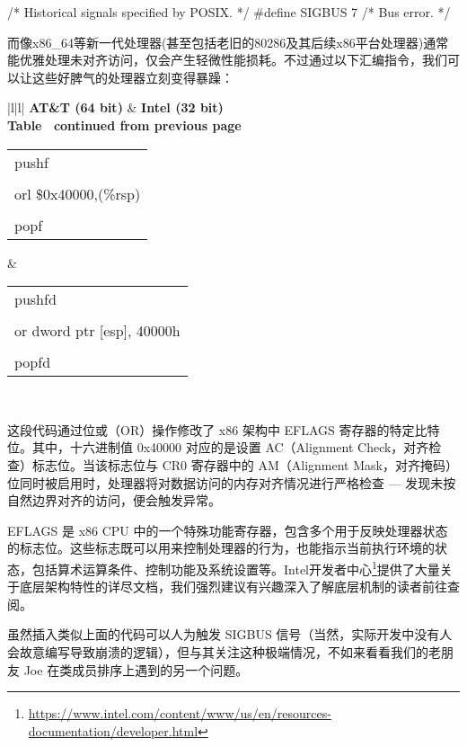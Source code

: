 \begin{cpp}
/* Historical signals specified by POSIX. */
#define SIGBUS         7    /* Bus error. */
\end{cpp}

而像x86\_64等新一代处理器(甚至包括老旧的80286及其后续x86平台处理器)通常能优雅处理未对齐访问，仅会产生轻微性能损耗。不过通过以下汇编指令，我们可以让这些好脾气的处理器立刻变得暴躁：

\begin{longtable}{|l|l|}
\hline
\textbf{AT\&T (64 bit)} &
  \textbf{Intel (32 bit)} \\ \hline
\endfirsthead
%
%
{{\bfseries Table \thetable\ continued from previous page}} \\
\endhead
%
\begin{tabular}[c]{@{}l@{}}pushf \\ \\ orl \$0x40000,(\%rsp) \\ \\ popf\end{tabular} &
  \begin{tabular}[c]{@{}l@{}}pushfd\\ \\ or dword ptr [esp], 40000h \\ \\ popfd\end{tabular} \\ \hline
\end{longtable}

这段代码通过位或（OR）操作修改了 x86 架构中 EFLAGS 寄存器的特定比特位。其中，十六进制值 0x40000 对应的是设置 AC（Alignment Check，对齐检查）标志位。当该标志位与 CR0 寄存器中的 AM（Alignment Mask，对齐掩码）位同时被启用时，处理器将对数据访问的内存对齐情况进行严格检查 --- 发现未按自然边界对齐的访问，便会触发异常。

EFLAGS 是 x86 CPU 中的一个特殊功能寄存器，包含多个用于反映处理器状态的标志位。这些标志既可以用来控制处理器的行为，也能指示当前执行环境的状态，包括算术运算条件、控制功能及系统设置等。Intel开发者中心\footnote{\url{https://www.intel.com/content/www/us/en/resources-documentation/developer.html}}提供了大量关于底层架构特性的详尽文档，我们强烈建议有兴趣深入了解底层机制的读者前往查阅。

虽然插入类似上面的代码可以人为触发 SIGBUS 信号（当然，实际开发中没有人会故意编写导致崩溃的逻辑），但与其关注这种极端情况，不如来看看我们的老朋友 Joe 在类成员排序上遇到的另一个问题。

